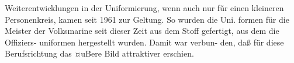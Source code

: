 Weiterentwicklungen in der Uniformierung,
wenn auch nur fǔr einen kleineren Personenkreis,
kamen seit 1961 zur Geltung. So wurden die Uni.
formen für die Meister der Volksmarine seit dieser
Zeit aus dem Stoff gefertigt, aus dem die Offiziers-
uniformen hergestellt wurden. Damit war verbun-
den, daß für diese Berufsrichtung das ¤uBere Bild
attraktiver erschien.